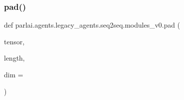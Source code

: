 \subsubsection{\texorpdfstring{pad()}{pad()}}
{\footnotesize\ttfamily def parlai.\+agents.\+legacy\+\_\+agents.\+seq2seq.\+modules\+\_\+v0.\+pad (\begin{DoxyParamCaption}\item[{}]{tensor,  }\item[{}]{length,  }\item[{}]{dim = {} }\end{DoxyParamCaption})}

